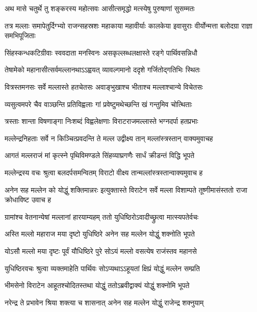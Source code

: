 \twolineshloka
{अथ मासे चतुर्थे तु शङ्करस्य महोत्सवः}
{आसीत्समृद्धो मत्स्येषु पुरुषाणां सुसम्मतः}


\onelineshloka
{तत्र मल्लाः समापेतुर्दिग्भ्यो राजन्सहस्रशः}
\twolineshloka
{महाकाया महावीर्याः कालकेया इवासुराः}
{वीर्योन्मत्ता बलोदग्रा राज्ञा समभिपूजिताः}


\twolineshloka
{सिंहस्कन्धकटिग्रीवाः स्ववदाता मनस्विनः}
{असकृल्लब्धलक्षास्ते रङ्गे पार्थिवसन्निधौ}


\twolineshloka
{तेषामेको महानासीत्सर्वमल्लानथाऽऽह्वयत्}
{व्यावल्गमानो ददृशे गर्जितोद्गतिभिः स्थितः}


\twolineshloka
{वित्रस्तमनसः सर्वे मल्लास्ते हतचेतसः}
{अवाङ्भुखाश्च भीताश्च मल्लाश्चान्ये विचेतसः}


\twolineshloka
{व्यसुत्वमपरे चैव वाञ्छन्ति प्रतिविह्वलाः}
{गां प्रवेष्टुमथेच्छन्ति खं गन्तुमिव चोत्थिताः}


\twolineshloka
{त्रस्ताः शान्ता विषणाङ्गा निःशब्दं विह्वलेक्षणाः}
{विराटराजमल्लास्ते भग्नदर्पा हतप्रभाः}


\twolineshloka
{मल्लेन्द्रनिहताः सर्वे न किञ्चित्प्रवदन्ति ते}
{मल्ल उद्वीक्ष्य तान् मल्लांस्त्रस्तान् वाक्यमुवाचह}


\twolineshloka
{आगतं मल्लराजं मां कृत्स्ने पृथिविमण्डले}
{सिंहव्याघ्रगणैः सार्धं क्रीडन्तं विद्धि भूपते}


\twolineshloka
{मल्लेन्द्रस्य वचः श्रुत्वा बलदर्पसमन्वितम्}
{विराटो वीक्ष्य तान्मल्लांस्त्रस्तान्वाक्यमुवाच ह}


\onelineshloka
{अनेन सह मल्लेन को योद्धुं शक्तिमान्नरः}
\twolineshloka
{इत्युक्तास्ते विराटेन सर्वे मल्ला विशाम्पते}
{तूष्णीमासंस्ततो राजा क्रोधाविष्ट उवाच ह}


\twolineshloka
{ग्रामांश्च वेतनान्येषां मल्लानां हारयाम्यहम्}
{ततो युधिष्ठिरोऽवादीच्छ्रुत्वा मात्स्यपतेर्वचः}


\twolineshloka
{अस्ति मल्लो महाराज मया दृष्टो युधिष्ठिरे}
{अनेन सह मल्लेन योद्धुं शक्नोति भूपते}


\twolineshloka
{योऽसौ मल्लो मया दृष्टः पूर्वं यौधिष्ठिरे पुरे}
{सोऽयं मल्लो वसत्येष राजंस्तव महानसे}



\twolineshloka
{युधिष्ठिरवचः श्रुत्वा व्यक्तमाहेति पार्थिवः}
{सोऽप्यथाऽऽहूयतां क्षिप्रं योद्धुं मल्लेन सम्प्रति}


\twolineshloka
{भीमसेनो विराटेन आहूतश्चोदितस्तथा}
{योद्धुं ततोऽब्रवीद्वाक्यं योद्धुं शक्नोमि भूपते}


\twolineshloka
{नरेन्द्र ते प्रभावेन श्रिया शक्त्या च शासनात्}
{अनेन सह मल्लेन योद्धुं राजेन्द्र शक्नुयाम्}


